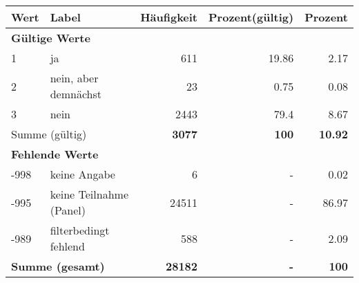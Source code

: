      \begin{longtable}{lXrrr}
     \toprule
     \textbf{Wert} & \textbf{Label} & \textbf{Häufigkeit} & \textbf{Prozent(gültig)} & \textbf{Prozent} \\
     \endhead
     \midrule
     \multicolumn{5}{l}{\textbf{Gültige Werte}}\\

     1 &
     \multicolumn{1}{X}{ ja   } &


       \num{611} &
       \num[round-mode=places,round-precision=2]{19.86} &
         \num[round-mode=places,round-precision=2]{2.17} \\

     2 &
     \multicolumn{1}{X}{ nein, aber demnächst   } &


       \num{23} &
       \num[round-mode=places,round-precision=2]{0.75} &
         \num[round-mode=places,round-precision=2]{0.08} \\

     3 &
     \multicolumn{1}{X}{ nein   } &


       \num{2443} &
       \num[round-mode=places,round-precision=2]{79.4} &
         \num[round-mode=places,round-precision=2]{8.67} \\
     \midrule
     \multicolumn{2}{l}{Summe (gültig)} &
       \textbf{\num{3077}} &
     \textbf{100} &
       \textbf{\num[round-mode=places,round-precision=2]{10.92}} \\
     \multicolumn{5}{l}{\textbf{Fehlende Werte}}\\
       -998 &
       keine Angabe &
         \num{6} &
        - &
         \num[round-mode=places,round-precision=2]{0.02} \\
       -995 &
       keine Teilnahme (Panel) &
         \num{24511} &
        - &
         \num[round-mode=places,round-precision=2]{86.97} \\
       -989 &
       filterbedingt fehlend &
         \num{588} &
        - &
         \num[round-mode=places,round-precision=2]{2.09} \\
     \midrule
     \multicolumn{2}{l}{\textbf{Summe (gesamt)}} &
          \textbf{\num{28182}} &
        \textbf{-} &
        \textbf{100} \\
     \bottomrule
     \end{longtable}
     
